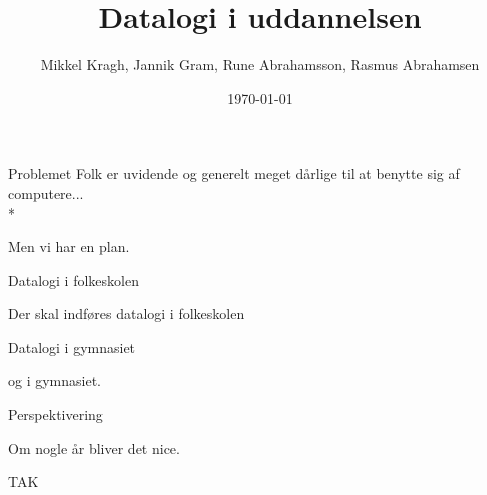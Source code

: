 \documentclass{beamer}
\title[Datalogi i uddannelsen]{Datalogi i uddannelsen}
\author{Mikkel Kragh, Jannik Gram, Rune Abrahamsson, Rasmus Abrahamsen}
\institute{DIKU}
\date{\today}
\begin{document}
\begin{frame}
\titlepage
\end{frame}


\begin{frame}{Problemet}
Folk er uvidende og generelt meget dårlige til at benytte sig af computere... \\*

Men vi har en plan.

\end{frame}

\begin{frame}{Datalogi i folkeskolen}

Der skal indføres datalogi i folkeskolen

\end{frame}

\begin{frame}{Datalogi i gymnasiet}

og i gymnasiet.

\end{frame}

\begin{frame}{Perspektivering}

Om nogle år bliver det nice.

\end{frame}

\begin{frame}{TAK}

\end{frame}
\end{document}
